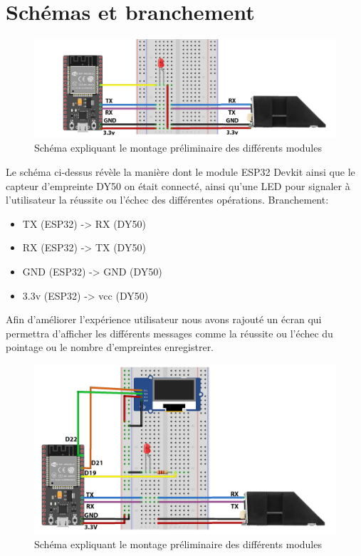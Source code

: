\section{Schémas et branchement}

 \begin{figure}[h!]
    \centering
    \includegraphics[scale=0.2]{images/schema/montage_illustration.png}
    \caption{Schéma expliquant le montage préliminaire des différents modules  }
    \label{fig52}
\end{figure}

Le schéma ci-dessus révèle la manière dont le module ESP32 Devkit ainsi que le 
capteur d’empreinte DY50 on était connecté, ainsi qu’une LED pour signaler à 
l’utilisateur la réussite ou l’échec des différentes opérations.\clearpage  
Branchement: 
\begin{itemize}
    \item [\textbullet]TX (ESP32) -> RX (DY50)
    \item [\textbullet]RX (ESP32) -> TX (DY50)
    \item [\textbullet]GND (ESP32) -> GND (DY50) 
    \item [\textbullet]3.3v (ESP32) -> vcc (DY50)    
\end{itemize}            
                
Afin d’améliorer l’expérience utilisateur nous avons rajouté un écran qui 
permettra d’afficher les différents messages comme la réussite ou l’échec 
du pointage ou le nombre d’empreintes enregistrer.

\begin{figure}[h!]
    \centering
    \includegraphics[scale=0.2]{images/schema/schemat v3 sans uvc.png}
    \caption{Schéma expliquant le montage préliminaire des différents modules}
    \label{fig53}
\end{figure}
    
